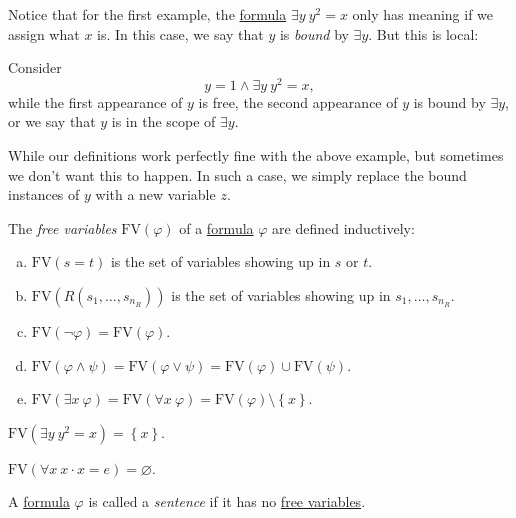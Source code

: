 Notice that for the first example, the \hyperref[def:formula]{formula} \(\exists y\ y^2 = x\) only has meaning if we assign what \(x\) is. In this case, we say that \(y\) is \emph{bound} by \(\exists y\). But this is local:

\begin{eg}
	Consider
	\[
		y=1 \land \exists y\ y^2 = x,
	\]
	while the first appearance of \(y\) is free, the second appearance of \(y\) is bound by \(\exists y\), or we say that \(y\) is in the scope of \(\exists y\).
\end{eg}

While our definitions work perfectly fine with the above example, but sometimes we don't want this to happen. In such a case, we simply replace the bound instances of \(y\) with a new variable \(z\).

\begin{definition}\label{def:free-variable}
	The \emph{free variables} \(\mathrm{FV}(\varphi )\) of a \hyperref[def:formula]{formula} \(\varphi \) are defined inductively:
	\begin{enumerate}[(a)]
		\item \(\mathrm{FV}(s=t) \) is the set of variables showing up in \(s\) or \(t\).
		\item \(\mathrm{FV}(R(s_1, \ldots , s_{n_R})) \) is the set of variables showing up in \(s_1, \ldots , s_{n_R}\).
		\item \(\mathrm{FV}(\lnot \varphi ) = \mathrm{FV} (\varphi )\).
		\item \(\mathrm{FV} (\varphi \land \psi ) = \mathrm{FV} (\varphi \lor \psi ) = \mathrm{FV}(\varphi ) \cup \mathrm{FV} (\psi ) \).
		\item \(\mathrm{FV} (\exists x\ \varphi ) = \mathrm{FV} (\forall x\ \varphi ) = \mathrm{FV} (\varphi ) \setminus \left\{ x \right\} \).
	\end{enumerate}
\end{definition}

\begin{eg}
	\(\mathrm{FV} (\exists y\ y^2 = x) = \left\{ x \right\} \).
\end{eg}

\begin{eg}
	\(\mathrm{FV} (\forall x\ x\cdot x = e) = \varnothing \).
\end{eg}

\begin{definition}[Sentence]\label{def:sentence}
	A \hyperref[def:formula]{formula} \(\varphi \) is called a \emph{sentence} if it has no \hyperref[def:free-variable]{free variables}.
\end{definition}

